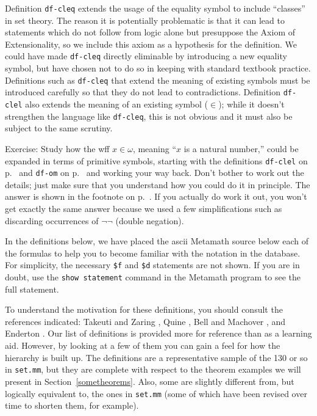 Definition \texttt{df-cleq} extends the usage of
the equality symbol to include ``classes'' in set theory.  The
reason it is potentially problematic is that it can lead to statements which
do not follow from logic alone but presuppose the Axiom of
Extensionality, so we include this axiom
as a hypothesis for the definition.  We could have made \texttt{df-cleq} directly
eliminable by introducing a new equality symbol, but have chosen not to do so
in keeping with standard textbook practice.  Definitions such as \texttt{df-cleq}
that extend the meaning of existing symbols must be introduced carefully so
that they do not lead to contradictions.  Definition \texttt{df-clel} also
extends the meaning of an existing symbol ($\in$); while it doesn't strengthen
the language like \texttt{df-cleq}, this is not obvious and it must also be
subject to the same scrutiny.

Exercise:  Study how the wff $x\in\omega$, meaning ``$x$ is a natural
number,'' could be expanded in terms of primitive symbols, starting with the
definitions \texttt{df-clel} on p.~\pageref{dfclel} and \texttt{df-om} on
p.~\pageref{dfom} and working your way back.  Don't bother to work out the
details; just make sure that you understand how you could do it in principle.
The answer is shown in the footnote on p.~\pageref{expandom}.  If you
actually do work it out, you won't get exactly the same answer because we used
a few simplifications such as discarding occurrences of $\lnot\lnot$ (double
negation).

In the definitions below, we have placed the {\sc ascii} Metamath source
below each of the formulas to help you to become familiar with the
notation in the database.  For simplicity, the necessary \texttt{\$f}
and \texttt{\$d} statements are not shown.  If you are in doubt, use the
\texttt{show statement} command
in the Metamath program to see the full statement.

To understand the motivation for these definitions, you should consult the
references indicated:  Takeuti and Zaring \cite{Takeuti},
Quine \cite{Quine}, Bell and Machover
\cite{Bell}, and Enderton \cite{Enderton}.  Our list of definitions is provided more for reference than as a
learning aid.  However, by looking at a few of them you can gain a feel for
how the hierarchy is built up.  The definitions are a representative sample of
the 130 or so in \texttt{set.mm}, but they are complete with respect to the
theorem examples we will present in Section~\ref{sometheorems}.  Also, some are
slightly different from, but logically equivalent to, the ones in \texttt{set.mm}
(some of which have been revised over time to shorten them, for example).

